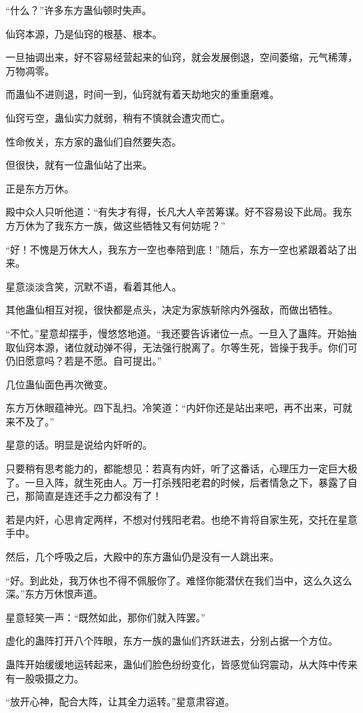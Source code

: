 \begin{this_body}
“什么？”许多东方蛊仙顿时失声。

仙窍本源，乃是仙窍的根基、根本。

一旦抽调出来，好不容易经营起来的仙窍，就会发展倒退，空间萎缩，元气稀薄，万物凋零。

而蛊仙不进则退，时间一到，仙窍就有着天劫地灾的重重磨难。

仙窍亏空，蛊仙实力就弱，稍有不慎就会遭灾而亡。

性命攸关，东方家的蛊仙们自然要失态。

但很快，就有一位蛊仙站了出来。

正是东方万休。

殿中众人只听他道：“有失才有得，长凡大人辛苦筹谋。好不容易设下此局。我东方万休为了我东方一族，做这些牺牲又有何妨呢？”

“好！不愧是万休大人，我东方一空也奉陪到底！”随后，东方一空也紧跟着站了出来。

星意淡淡含笑，沉默不语，看着其他人。

其他蛊仙相互对视，很快都是点头，决定为家族斩除内外强敌，而做出牺牲。

“不忙。”星意却摆手，慢悠悠地道。“我还要告诉诸位一点。一旦入了蛊阵。开始抽取仙窍本源，诸位就动弹不得，无法强行脱离了。尔等生死，皆操于我手。你们可仍旧愿意吗？若是不愿。自可提出。”

几位蛊仙面色再次微变。

东方万休眼蕴神光。四下乱扫。冷笑道：“内奸你还是站出来吧，再不出来，可就来不及了。”

星意的话。明显是说给内奸听的。

只要稍有思考能力的，都能想见：若真有内奸，听了这番话，心理压力一定巨大极了。一旦入阵，就生死由人。万一打杀残阳老君的时候，后者情急之下，暴露了自己，那简直是连还手之力都没有了！

若是内奸，心思肯定两样，不想对付残阳老君。也绝不肯将自家生死，交托在星意手中。

然后，几个呼吸之后，大殿中的东方蛊仙仍是没有一人跳出来。

“好。到此处，我万休也不得不佩服你了。难怪你能潜伏在我们当中，这么久这么深。”东方万休恨声道。

星意轻笑一声：“既然如此，那你们就入阵罢。”

虚化的蛊阵打开八个阵眼，东方一族的蛊仙们齐跃进去，分别占据一个方位。

蛊阵开始缓缓地运转起来，蛊仙们脸色纷纷变化，皆感觉仙窍震动，从大阵中传来有一股吸摄之力。

“放开心神，配合大阵，让其全力运转。”星意肃容道。


\end{this_body}
